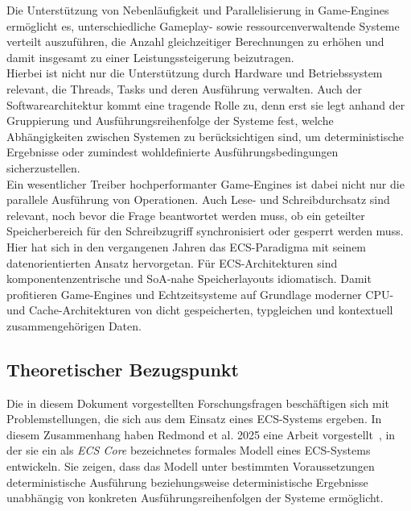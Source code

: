 
Die Unterstützung von Nebenläufigkeit und Parallelisierung in Game-Engines ermöglicht es, unterschiedliche Gameplay- sowie ressourcenverwaltende Systeme verteilt auszuführen, die Anzahl gleichzeitiger Berechnungen zu erhöhen und damit insgesamt zu einer Leistungssteigerung beizutragen.\\

Hierbei ist nicht nur die Unterstützung durch Hardware und Betriebssystem relevant, die Threads, Tasks und deren Ausführung verwalten.
Auch der Softwarearchitektur kommt eine tragende Rolle zu, denn erst sie legt anhand der Gruppierung und Ausführungsreihenfolge der Systeme fest, welche Abhängigkeiten zwischen Systemen zu berücksichtigen sind, um deterministische Ergebnisse oder zumindest wohldefinierte Ausführungsbedingungen sicherzustellen.\\

Ein wesentlicher Treiber hochperformanter Game-Engines ist dabei nicht nur die parallele Ausführung von Operationen. Auch Lese- und Schreibdurchsatz sind relevant, noch bevor die Frage beantwortet werden muss, ob ein geteilter Speicherbereich für den Schreibzugriff synchronisiert oder gesperrt werden muss.\\

Hier hat sich in den vergangenen Jahren das ECS-Paradigma mit seinem datenorientierten Ansatz hervorgetan. Für ECS-Architekturen sind komponentenzentrische und SoA-nahe Speicherlayouts idiomatisch.
Damit profitieren Game-Engines und Echtzeitsysteme auf Grundlage moderner CPU- und Cache-Architekturen von dicht gespeicherten, typgleichen und kontextuell zusammengehörigen Daten.

\subsection*{Theoretischer Bezugspunkt}

Die in diesem Dokument vorgestellten Forschungsfragen beschäftigen sich mit Problemstellungen, die sich aus dem Einsatz eines ECS-Systems ergeben.
In diesem Zusammenhang haben Redmond et al. 2025 eine Arbeit vorgestellt~\cite{RCCM+25}, in der sie ein als \textit{ECS Core} bezeichnetes formales Modell eines ECS-Systems entwickeln.
Sie zeigen, dass das Modell unter bestimmten Voraussetzungen deterministische Ausführung beziehungsweise deterministische Ergebnisse unabhängig von konkreten Ausführungsreihenfolgen der Systeme ermöglicht.\\


